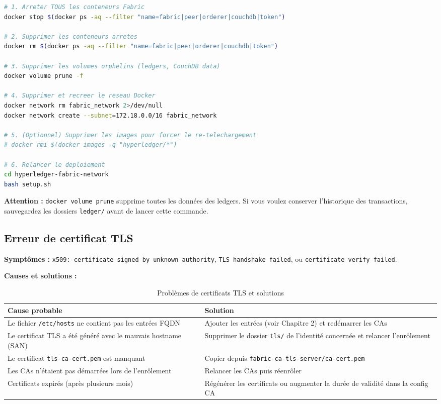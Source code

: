 \documentclass[12pt,a4paper,twoside]{report}
\begin{document}
\begin{lstlisting}[language=bash, caption=Reset complet des conteneurs Docker]
# 1. Arreter TOUS les conteneurs Fabric
docker stop $(docker ps -aq --filter "name=fabric|peer|orderer|couchdb|token")

# 2. Supprimer les conteneurs arretes
docker rm $(docker ps -aq --filter "name=fabric|peer|orderer|couchdb|token")

# 3. Supprimer les volumes orphelins (ledgers, CouchDB data)
docker volume prune -f

# 4. Supprimer et recreer le reseau Docker
docker network rm fabric_network 2>/dev/null
docker network create --subnet=172.18.0.0/16 fabric_network

# 5. (Optionnel) Supprimer les images pour forcer le re-telechargement
# docker rmi $(docker images -q "hyperledger/*")

# 6. Relancer le deploiement
cd hyperledger-fabric-network
bash setup.sh
\end{lstlisting}

\begin{warningbox}
\textbf{Attention :} \texttt{docker volume prune} supprime toutes les données des ledgers. Si vous voulez conserver l'historique des transactions, sauvegardez les dossiers \texttt{ledger/} avant de lancer cette commande.
\end{warningbox}

\subsection{Erreur de certificat TLS}

\textbf{Symptômes :} \texttt{x509: certificate signed by unknown authority}, \texttt{TLS handshake failed}, ou \texttt{certificate verify failed}.

\textbf{Causes et solutions :}

\begin{table}[H]
\centering
\begin{tabularx}{\textwidth}{Xp{7cm}}
\toprule
\textbf{Cause probable} & \textbf{Solution} \\
\midrule
Le fichier \texttt{/etc/hosts} ne contient pas les entrées FQDN & Ajouter les entrées (voir Chapitre 2) et redémarrer les CAs \\
Le certificat TLS a été généré avec le mauvais hostname (SAN) & Supprimer le dossier \texttt{tls/} de l'identité concernée et relancer l'enrôlement \\
Le certificat \texttt{tls-ca-cert.pem} est manquant & Copier depuis \texttt{fabric-ca-tls-server/ca-cert.pem} \\
Les CAs n'étaient pas démarrées lors de l'enrôlement & Relancer les CAs puis réenrôler \\
Certificats expirés (après plusieurs mois) & Régénérer les certificats ou augmenter la durée de validité dans la config CA \\
\bottomrule
\end{tabularx}
\caption{Problèmes de certificats TLS et solutions}
\end{table}
\end{document}
